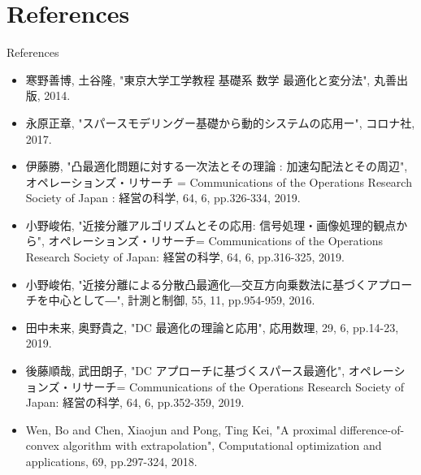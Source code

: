 \documentclass[aspectratio=169, dvipdfmx, 10.5pt]{beamer} %
\begin{document}
\section*{References}
\begin{frame}{References}
    \begin{minipage}[b]{0.95\textwidth}
    {\scriptsize
    \begin{itemize}
        \item 寒野善博, 土谷隆, "東京大学工学教程 基礎系 数学 最適化と変分法", 丸善出版, 2014.
        \item 永原正章, "スパースモデリングー基礎から動的システムの応用ー", コロナ社, 2017.
        \item 伊藤勝, "凸最適化問題に対する一次法とその理論 : 加速勾配法とその周辺", オペレーションズ・リサーチ = Communications of the Operations Research Society of Japan : 経営の科学, 64, 6, pp.326-334, 2019.
        \item 小野峻佑, "近接分離アルゴリズムとその応用: 信号処理・画像処理的観点から", オペレーションズ・リサーチ= Communications of the Operations Research Society of Japan: 経営の科学, 64, 6, pp.316-325, 2019.
        \item 小野峻佑, "近接分離による分散凸最適化―交互方向乗数法に基づくアプローチを中心として―", 計測と制御, 55, 11, pp.954-959, 2016.
        \item 田中未来, 奥野貴之, "DC 最適化の理論と応用", 応用数理, 29, 6, pp.14-23, 2019.
        \item 後藤順哉, 武田朗子, "DC アプローチに基づくスパース最適化", オペレーションズ・リサーチ= Communications of the Operations Research Society of Japan: 経営の科学, 64, 6, pp.352-359, 2019.
        \item Wen, Bo and Chen, Xiaojun and Pong, Ting Kei, "A proximal difference-of-convex algorithm with extrapolation", Computational optimization and applications, 69, pp.297-324, 2018.
    \end{itemize}
    }
\end{minipage}
\end{frame}
\end{document}

